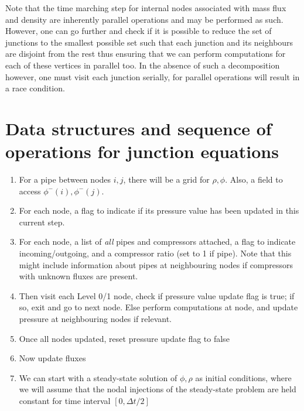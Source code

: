\documentclass{amsart}
\begin{document}
Note that the time marching step for internal nodes associated with mass flux and density are inherently parallel operations and may be performed as such. However, one can go further and check if it is possible to reduce the set of junctions to the  smallest possible set such that each junction and its neighbours are disjoint from the rest thus ensuring that we can perform computations for each of these vertices in parallel too. In the absence of such a decomposition however,  one must visit each junction serially, 
for parallel operations will result in a race condition.


\section{Data structures and sequence of operations for junction equations}
\begin{enumerate}
\item For a pipe between nodes $i, j$, there will be a grid for $\rho, \phi$. Also, a field to access $\phi^-(i), \phi^-(j)$.
\item For each node, a flag to indicate if its pressure value has been updated in this current step.
\item For each node, a list of \emph{all} pipes and compressors attached, a flag to indicate incoming/outgoing, and a compressor ratio (set to 1 if pipe). Note that this might include information about pipes at neighbouring nodes if compressors with unknown fluxes are present.
\item Then visit each Level 0/1 node, check if pressure value update flag is true; if so, exit and go to next node. Else perform computations at node, and update pressure at neighbouring nodes if relevant.
\item Once all nodes updated, reset pressure update flag to false
\item Now update fluxes
\item We can start with a steady-state solution of $\phi, \rho$ as initial conditions, where we will assume that the nodal injections of the steady-state problem are held constant for time interval $[0, \Delta t/2]$
\end{enumerate}
\end{document}
